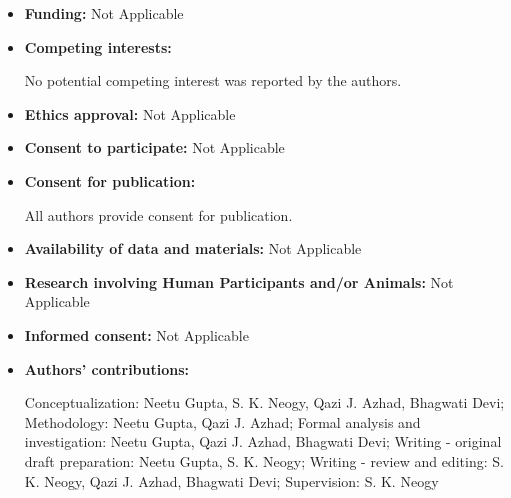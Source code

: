 \documentclass[11pt,a4paper]{article}
\numberwithin{equation}{section}
\begin{document}
\begin{itemize}

	\item \textbf{Funding:} Not Applicable

	\item \textbf{Competing interests: }

	No potential competing interest was reported by the authors.

	\item \textbf{Ethics approval:} Not Applicable 

	\item \textbf{Consent to participate:} Not Applicable

	\item \textbf{Consent for publication:} 

	All authors provide consent for publication.

	\item \textbf{Availability of data and materials:} Not Applicable

	\item \textbf{Research involving Human Participants and/or Animals:} Not Applicable

	\item \textbf{Informed consent:} Not Applicable


	\item \textbf{Authors' contributions:} 

	Conceptualization: Neetu Gupta, S. K. Neogy, Qazi J. Azhad, Bhagwati Devi; Methodology: Neetu Gupta, Qazi J. Azhad; Formal analysis and investigation: Neetu Gupta, Qazi J. Azhad, Bhagwati Devi; Writing - original draft preparation: Neetu Gupta, S. K. Neogy; Writing - review and editing: S. K. Neogy, Qazi J. Azhad, Bhagwati Devi;  Supervision: S. K. Neogy

\end{itemize}

	

	
\end{document}
